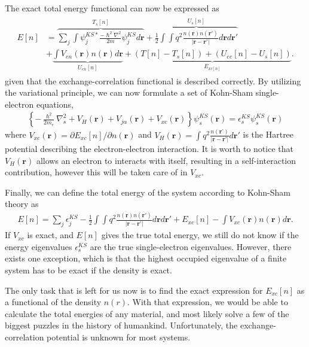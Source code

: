 The exact total energy functional can now be expressed as
\begin{align}
  \begin{aligned}
  E[n]
  &= \overbrace{\sum_j \int \psi_j^{KS*} \frac{-\hslash^2\nabla^2}{2m} \psi_j^{KS}d\textbf{r}}^{T_s[n]} + \overbrace{\frac{1}{2}\int \int q^2\frac{n(\textbf{r})n(\textbf{r}')}{\lvert \textbf{r}-\textbf{r}'\rvert} d\textbf{r}d\textbf{r}'}^{U_s[n]}
  \\ &+ \underbrace{\int V_{en}(\textbf{r})n(\textbf{r})d\textbf{r}}_{U_{en}[n]} + \underbrace{\left(T[n] - T_s[n] \right) + \left( U_{ee}[n] - U_s[n] \right)}_{E_{xc[n]}}.
  \end{aligned}
\end{align}
given that the exchange-correlation functional is described correctly. By utilizing the variational principle, we can now formulate a set of Kohn-Sham single-electron equations,
\begin{align}
  \left\{ -\frac{\hslash^2}{2m_e}\nabla^2_s + V_H(\textbf{r}) + V_{j\alpha}(\textbf{r}) + V_{xc}(\textbf{r}) \right\} \psi_s^{KS}(\textbf{r}) = \epsilon_s^{KS} \psi_s^{KS}(\textbf{r})
  \label{eq:singleKS}
\end{align}
where $V_{xc}(\textbf{r})=\partial E_{xc}[n]/\partial n(\textbf{r})$ and $V_{H}(\textbf{r})=\int q^2 \frac{n(\textbf{r'})}{\lvert \textbf{r} - \textbf{r}'\rvert} d\textbf{r}'$ is the Hartree potential describing the electron-electron interaction. It is worth to notice that $V_H(\textbf{r})$ allows an electron to interacts with itself, resulting in a self-interaction contribution, however this will be taken care of in $V_{xc}$.

Finally, we can define the total energy of the system according to Kohn-Sham theory as
\begin{align}
  E[n] = \sum_{j}\epsilon_j^{KS}-\frac{1}{2}\int \int q^2 \frac{n(\textbf{r})n(\textbf{r}')}{\lvert \textbf{r} - \textbf{r}' \rvert} d\textbf{r}d\textbf{r}' + E_{xc}[n] - \int V_{xc}(\textbf{r})n(\textbf{r})d\textbf{r}.
\end{align}
If $V_{xc}$ is exact, and $E[n]$ gives the true total energy, we still do not know if the energy eigenvalues $\epsilon_s^{KS}$ are the true single-electron eigenvalues. However, there exists one exception, which is that the highest occupied eigenvalue of a finite system has to be exact if the density is exact.

The only task that is left for us now is to find the exact expression for $E_{xc}[n]$ as a functional of the density $n(r)$. With that expression, we would be able to calculate the total energies of any material, and most likely solve a few of the biggest puzzles in the history of humankind. Unfortunately, the exchange-correlation potential is unknown for most systems.

